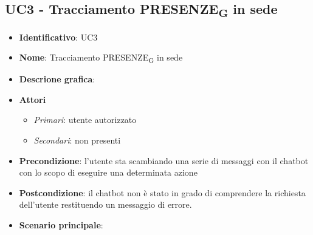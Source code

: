 \subsection{UC3 - Tracciamento PRESENZE\textsubscript{G} in sede}
\begin{itemize}
    \item \textbf{Identificativo}: UC3
    \item \textbf{Nome}: Tracciamento PRESENZE\textsubscript{G} in sede
    \item \textbf{Descrione grafica}:
    \item \textbf{Attori}
 \begin{itemize} 
    \item \textit{Primari}: utente autorizzato
    \item \textit{Secondari}: non presenti
 \end{itemize}
 \item \textbf{Precondizione}: l'utente sta scambiando una serie di messaggi con il chatbot con lo scopo di eseguire una determinata azione
 \item \textbf{Postcondizione}: il chatbot non è stato in grado di comprendere la richiesta dell'utente restituendo un messaggio di errore.  
 \item \textbf{Scenario principale}: 
\end{itemize}